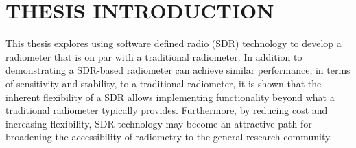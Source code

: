 \chapter{THESIS INTRODUCTION}\label{ch:intro}




This thesis explores using software defined radio (SDR) technology to develop a radiometer that is on par with a traditional radiometer.  In addition to demonstrating a SDR-based radiometer can achieve similar performance, in terms of sensitivity and stability, to a traditional radiometer, it is shown that the inherent flexibility of a SDR allows implementing functionality beyond what a traditional radiometer typically provides.  Furthermore, by reducing cost and increasing flexibility, SDR technology may become an attractive path for broadening the accessibility of radiometry to the general research community.


